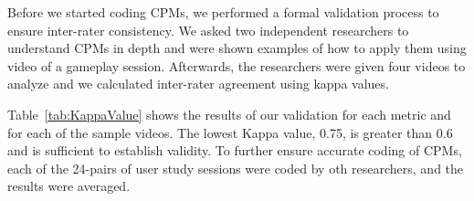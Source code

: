 Before we started coding CPMs, we performed a formal validation process to ensure inter-rater consistency. We asked two independent researchers to understand CPMs in depth and were shown examples of how to apply them using video of a gameplay session. Afterwards, the researchers were given four videos to analyze and we calculated inter-rater agreement using kappa values\cite{Kappa1,Kappa2}. 

Table~\ref{tab:KappaValue} shows the results of our validation for each metric and for each of the sample videos. The lowest Kappa value, 0.75, is greater than 0.6 and is sufficient to establish validity. To further ensure accurate coding of CPMs, each of the 24-pairs of user study sessions were coded by oth researchers, and the results were averaged. 


